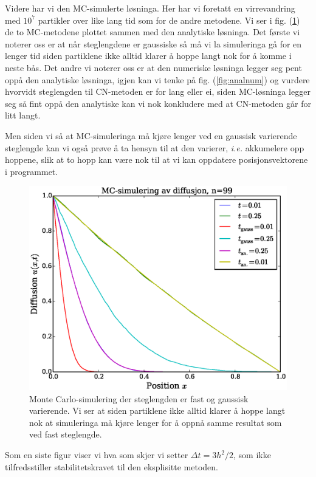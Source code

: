 \documentclass[norsk, 10pt]{article}
\begin{document}
Videre har vi den MC-simulerte løsninga. Her har vi foretatt en virrevandring med $10^7$ partikler over like lang tid som for de andre metodene. Vi ser i fig. (\ref{fig:analMC}) de to MC-metodene plottet sammen med den analytiske løsninga. Det første vi noterer oss er at når steglengdene er gaussiske så må vi la simuleringa gå for en lenger tid siden partiklene ikke alltid klarer å hoppe langt nok for å komme i neste bås. Det andre vi noterer oss er at den numeriske løsninga legger seg pent oppå den analytiske løsninga, igjen kan vi tenke på fig. (\ref{fig:analnum}) og vurdere hvorvidt steglengden til CN-metoden er for lang eller ei, siden MC-løsninga legger seg så fint oppå den analytiske kan vi nok konkludere med at CN-metoden går for litt langt.

Men siden vi så at MC-simuleringa må kjøre lenger ved en gaussisk varierende steglengde kan vi også prøve å ta hensyn til at den varierer, \emph{i.e.} akkumelere opp hoppene, slik at to hopp kan være nok til at vi kan oppdatere posisjonsvektorene  i programmet.
\begin{figure}[H]
\centerline{\includegraphics[scale = 0.5]{MC_walk.eps}}
\caption{Monte Carlo-simulering der steglengden er fast og gaussisk varierende. Vi ser at siden partiklene ikke alltid klarer å hoppe langt nok at simuleringa må kjøre lenger for å oppnå samme resultat som ved fast steglengde.}
\label{fig:analMC}
\end{figure}
Som en siste figur viser vi hva som skjer vi setter $\Delta t = 3h^2/2$, som ikke tilfredsstiller stabilitetskravet til den eksplisitte metoden.
\end{document}
